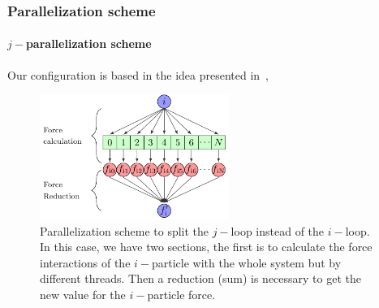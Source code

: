 \begin{frame}
    \frametitle{Parallelization scheme}
    \framesubtitle{$j-$parallelization scheme}

    Our configuration is based in the idea presented in~\cite{NitadoriAarseth2012},

    \begin{center}
    \begin{figure}[H]
        \centering
        \includegraphics[width=0.55\textwidth]{img/force_split_reduction.pdf}
        \caption{Parallelization scheme to split the $j-$loop instead of the $i-$loop.
                 In this case, we have two sections, the first is to calculate
                 the force interactions of the $i-$particle with the whole
                 system but by different threads. Then a reduction (sum) is necessary
                 to get the new value for the $i-$particle force.}
        \label{fig:force_split_reduction}
    \end{figure}
    \end{center}

\end{frame}

